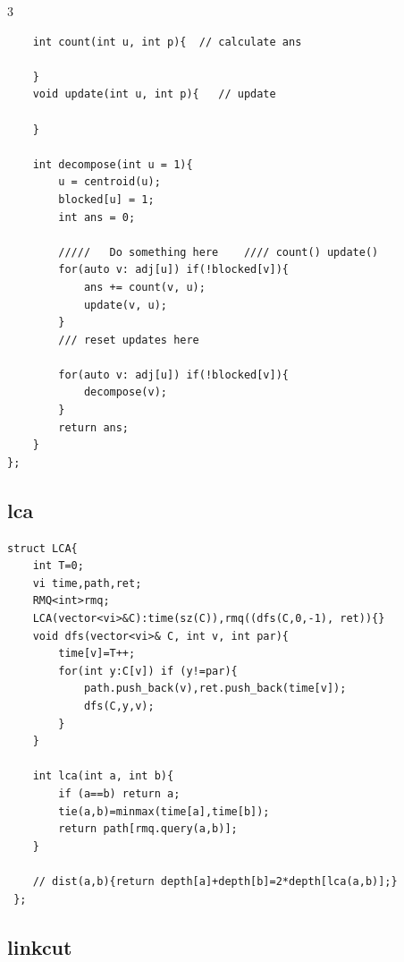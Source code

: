 \documentclass[twoside]{article}
\begin{document}
\begin{multicols*}{3}
\begin{verbatim}
    int count(int u, int p){  // calculate ans

    }
    void update(int u, int p){   // update
            
    } 

    int decompose(int u = 1){
        u = centroid(u);
        blocked[u] = 1;
        int ans = 0;
        
        /////   Do something here    //// count() update()
        for(auto v: adj[u]) if(!blocked[v]){
            ans += count(v, u);
            update(v, u);
        }
        /// reset updates here

        for(auto v: adj[u]) if(!blocked[v]){
            decompose(v);
        }
        return ans;
    }
};
\end{verbatim}

{
\subsection*{lca}
}
\begin{verbatim}
struct LCA{
    int T=0;
    vi time,path,ret;
    RMQ<int>rmq;
    LCA(vector<vi>&C):time(sz(C)),rmq((dfs(C,0,-1), ret)){}
    void dfs(vector<vi>& C, int v, int par){
        time[v]=T++;
        for(int y:C[v]) if (y!=par){
            path.push_back(v),ret.push_back(time[v]);
            dfs(C,y,v);
        }
    }

    int lca(int a, int b){
        if (a==b) return a;
        tie(a,b)=minmax(time[a],time[b]);
        return path[rmq.query(a,b)];
    }

    // dist(a,b){return depth[a]+depth[b]=2*depth[lca(a,b)];}
 };
\end{verbatim}

{
\subsection*{linkcut}
}
\begin{verbatim}


\end{verbatim}
\end{multicols*}
\end{document}
